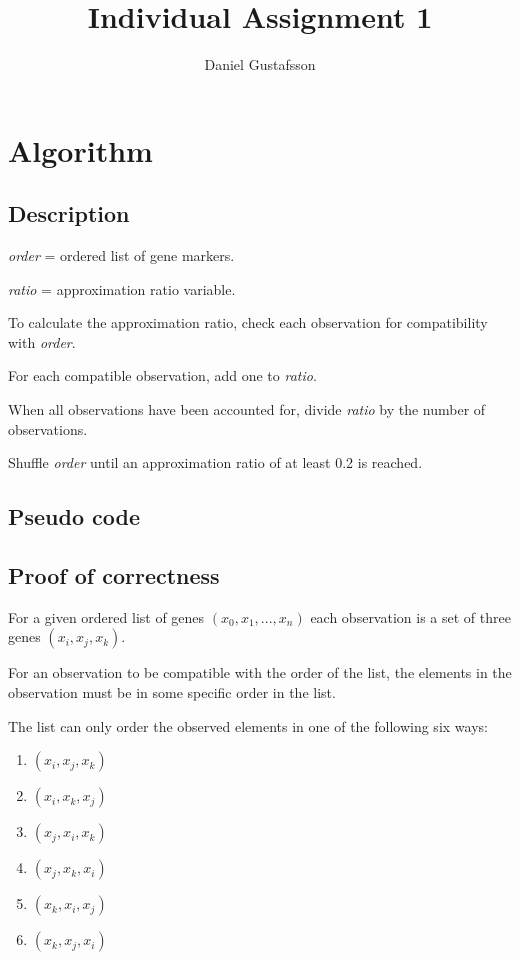 \documentclass[11pt, a4paper]{article}
\title{Individual Assignment 1}
\author{Daniel Gustafsson}
\begin{document}
\maketitle	

\section{Algorithm}
\subsection{Description}
\noindent\textit{order} = ordered list of gene markers.

\noindent\textit{ratio} = approximation ratio variable.

\noindent To calculate the approximation ratio, check each observation
for compatibility with \textit{order}.

\noindent For each compatible observation, add one to \textit{ratio}.

\noindent When all observations have been accounted for, divide \textit{ratio}
by the number of observations.

\noindent Shuffle \textit{order} until an approximation
ratio of at least 0.2 is reached.

\subsection{Pseudo code}


\subsection{Proof of correctness}
For a given ordered list of genes $(x_0, x_1, ... , x_n)$ each
observation is a set of three genes $(x_i, x_j, x_k)$.

\noindent For an observation to be compatible with the order of the list,
the elements in the observation must be in some specific order
in the list.

\noindent The list can only order the observed elements in one of
the following six ways:

\begin{enumerate}
\item $(x_i, x_j, x_k)$

\item $(x_i, x_k, x_j)$

\item $(x_j, x_i, x_k)$

\item $(x_j, x_k, x_i)$

\item $(x_k, x_i, x_j)$

\item $(x_k, x_j, x_i)$
\end{enumerate}
\end{document}

